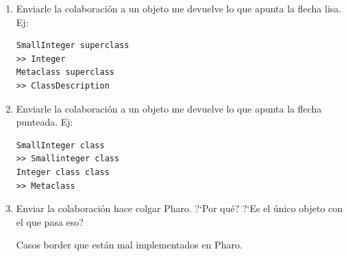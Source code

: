 \begin{enumerate}
\begin{enumerate}
  \end{enumerate}

 \item Enviarle la colaboraci\'on  a un objeto me devuelve lo que apunta la flecha lisa. Ej: 
\begin{verbatim}
SmallInteger superclass
>> Integer
Metaclass superclass
>> ClassDescription
\end{verbatim}

 \item Enviarle la colaboraci\'on  a un objeto me devuelve lo que apunta la flecha punteada. Ej: 
\begin{verbatim}
SmallInteger class
>> Smallinteger class
Integer class class
>> Metaclass
\end{verbatim}
  
 \item Enviar la colaboraci\'on  hace colgar Pharo. ?`Por qu\'e? ?`Es el \'unico objeto con el que pasa eso? 

 Casos border que est\'an mal implementados en Pharo. 
\end{enumerate}